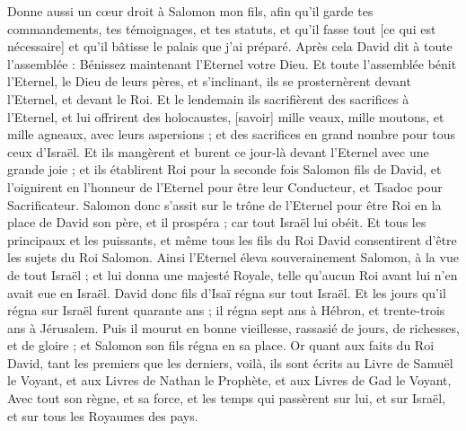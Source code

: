 \begin{multicols}{2}
Donne aussi un cœur droit à Salomon mon fils, afin qu'il garde tes commandements, tes témoignages, et tes statuts, et qu'il fasse tout [ce qui est nécessaire] et qu'il bâtisse le palais que j'ai préparé.
Après cela David dit à toute l'assemblée : Bénissez maintenant l'Eternel votre Dieu. Et toute l'assemblée bénit l'Eternel, le Dieu de leurs pères, et s'inclinant, ils se prosternèrent devant l'Eternel, et devant le Roi.
Et le lendemain ils sacrifièrent des sacrifices à l'Eternel, et lui offrirent des holocaustes, [savoir] mille veaux, mille moutons, et mille agneaux, avec leurs aspersions ; et des sacrifices en grand nombre pour tous ceux d'Israël.
Et ils mangèrent et burent ce jour-là devant l'Eternel avec une grande joie ; et ils établirent Roi pour la seconde fois Salomon fils de David, et l'oignirent en l'honneur de l'Eternel pour être leur Conducteur, et Tsadoc pour Sacrificateur.
Salomon donc s'assit sur le trône de l'Eternel pour être Roi en la place de David son père, et il prospéra ; car tout Israël lui obéit.
Et tous les principaux et les puissants, et même tous les fils du Roi David consentirent d'être les sujets du Roi Salomon.
Ainsi l'Eternel éleva souverainement Salomon, à la vue de tout Israël ; et lui donna une majesté Royale, telle qu'aucun Roi avant lui n'en avait eue en Israël.
David donc fils d'Isaï régna sur tout Israël.
Et les jours qu'il régna sur Israël furent quarante ans ; il régna sept ans à Hébron, et trente-trois ans à Jérusalem.
Puis il mourut en bonne vieillesse, rassasié de jours, de richesses, et de gloire ; et Salomon son fils régna en sa place.
Or quant aux faits du Roi David, tant les premiers que les derniers, voilà, ils sont écrits au Livre de Samuël le Voyant, et aux Livres de Nathan le Prophète, et aux Livres de Gad le Voyant,
Avec tout son règne, et sa force, et les temps qui passèrent sur lui, et sur Israël, et sur tous les Royaumes des pays.
\PPE{}
\end{multicols}
